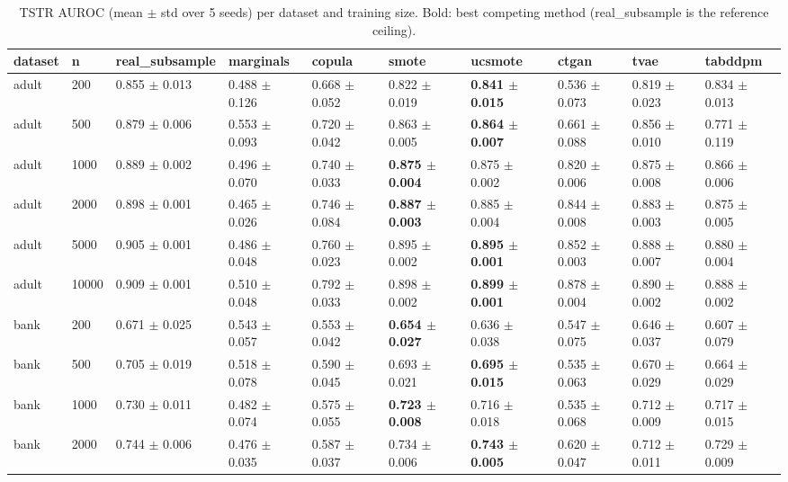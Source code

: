 \begin{table}
\caption{TSTR AUROC (mean $\pm$ std over 5 seeds) per dataset and training size. Bold: best competing method (real\_subsample is the reference ceiling).}
\label{tab:main}
\begin{tabular}{llllllllll}
\toprule
dataset & n & real\_subsample & marginals & copula & smote & ucsmote & ctgan & tvae & tabddpm \\
\midrule
adult & 200 & 0.855 $\pm$ 0.013 & 0.488 $\pm$ 0.126 & 0.668 $\pm$ 0.052 & 0.822 $\pm$ 0.019 & \textbf{0.841 $\pm$ 0.015} & 0.536 $\pm$ 0.073 & 0.819 $\pm$ 0.023 & 0.834 $\pm$ 0.013 \\
adult & 500 & 0.879 $\pm$ 0.006 & 0.553 $\pm$ 0.093 & 0.720 $\pm$ 0.042 & 0.863 $\pm$ 0.005 & \textbf{0.864 $\pm$ 0.007} & 0.661 $\pm$ 0.088 & 0.856 $\pm$ 0.010 & 0.771 $\pm$ 0.119 \\
adult & 1000 & 0.889 $\pm$ 0.002 & 0.496 $\pm$ 0.070 & 0.740 $\pm$ 0.033 & \textbf{0.875 $\pm$ 0.004} & 0.875 $\pm$ 0.002 & 0.820 $\pm$ 0.006 & 0.875 $\pm$ 0.008 & 0.866 $\pm$ 0.006 \\
adult & 2000 & 0.898 $\pm$ 0.001 & 0.465 $\pm$ 0.026 & 0.746 $\pm$ 0.084 & \textbf{0.887 $\pm$ 0.003} & 0.885 $\pm$ 0.004 & 0.844 $\pm$ 0.008 & 0.883 $\pm$ 0.003 & 0.875 $\pm$ 0.005 \\
adult & 5000 & 0.905 $\pm$ 0.001 & 0.486 $\pm$ 0.048 & 0.760 $\pm$ 0.023 & 0.895 $\pm$ 0.002 & \textbf{0.895 $\pm$ 0.001} & 0.852 $\pm$ 0.003 & 0.888 $\pm$ 0.007 & 0.880 $\pm$ 0.004 \\
adult & 10000 & 0.909 $\pm$ 0.001 & 0.510 $\pm$ 0.048 & 0.792 $\pm$ 0.033 & 0.898 $\pm$ 0.002 & \textbf{0.899 $\pm$ 0.001} & 0.878 $\pm$ 0.004 & 0.890 $\pm$ 0.002 & 0.888 $\pm$ 0.002 \\
bank & 200 & 0.671 $\pm$ 0.025 & 0.543 $\pm$ 0.057 & 0.553 $\pm$ 0.042 & \textbf{0.654 $\pm$ 0.027} & 0.636 $\pm$ 0.038 & 0.547 $\pm$ 0.075 & 0.646 $\pm$ 0.037 & 0.607 $\pm$ 0.079 \\
bank & 500 & 0.705 $\pm$ 0.019 & 0.518 $\pm$ 0.078 & 0.590 $\pm$ 0.045 & 0.693 $\pm$ 0.021 & \textbf{0.695 $\pm$ 0.015} & 0.535 $\pm$ 0.063 & 0.670 $\pm$ 0.029 & 0.664 $\pm$ 0.029 \\
bank & 1000 & 0.730 $\pm$ 0.011 & 0.482 $\pm$ 0.074 & 0.575 $\pm$ 0.055 & \textbf{0.723 $\pm$ 0.008} & 0.716 $\pm$ 0.018 & 0.535 $\pm$ 0.068 & 0.712 $\pm$ 0.009 & 0.717 $\pm$ 0.015 \\
bank & 2000 & 0.744 $\pm$ 0.006 & 0.476 $\pm$ 0.035 & 0.587 $\pm$ 0.037 & 0.734 $\pm$ 0.006 & \textbf{0.743 $\pm$ 0.005} & 0.620 $\pm$ 0.047 & 0.712 $\pm$ 0.011 & 0.729 $\pm$ 0.009 \\

\end{tabular}
\end{table}
